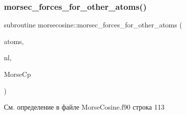 \subsubsection{\texorpdfstring{morsec\+\_\+forces\+\_\+for\+\_\+other\+\_\+atoms()}{morsec\_forces\_for\_other\_atoms()}}
{\footnotesize\ttfamily subroutine morsecosine\+::morsec\+\_\+forces\+\_\+for\+\_\+other\+\_\+atoms (\begin{DoxyParamCaption}\item[{type(\mbox{\hyperlink{structmd__general_1_1particles}{particles}})}]{atoms,  }\item[{type(\mbox{\hyperlink{structmd__general_1_1neighbour__list}{neighbour\+\_\+list}})}]{nl,  }\item[{type(\mbox{\hyperlink{structmorsecosine_1_1morsecosine__parameters}{morsecosine\+\_\+parameters}})}]{Morse\+Cp }\end{DoxyParamCaption})}



См. определение в файле Morse\+Cosine.\+f90 строка 113


